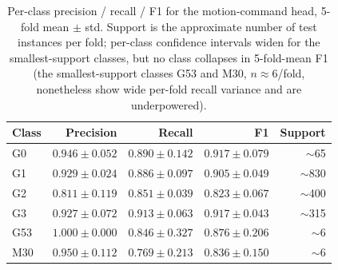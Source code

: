 \begin{table}[H]
\centering
\caption{Per-class precision / recall / F1 for the motion-command head, 5-fold mean $\pm$ std. Support is the approximate number of test instances per fold; per-class confidence intervals widen for the smallest-support classes, but no class collapses in 5-fold-mean F1 (the smallest-support classes G53 and M30, $n\!\approx\!6$/fold, nonetheless show wide per-fold recall variance and are underpowered).}
\label{tab:per_class_command}
\begin{tabular}{lrrrr}
\toprule
Class & Precision & Recall & F1 & Support \\
\midrule
G0  & $0.946 \pm 0.052$ & $0.890 \pm 0.142$ & $0.917 \pm 0.079$ & $\sim$65  \\
G1  & $0.929 \pm 0.024$ & $0.886 \pm 0.097$ & $0.905 \pm 0.049$ & $\sim$830 \\
G2  & $0.811 \pm 0.119$ & $0.851 \pm 0.039$ & $0.823 \pm 0.067$ & $\sim$400 \\
G3  & $0.927 \pm 0.072$ & $0.913 \pm 0.063$ & $0.917 \pm 0.043$ & $\sim$315 \\
G53 & $1.000 \pm 0.000$ & $0.846 \pm 0.327$ & $0.876 \pm 0.206$ & $\sim$6   \\
M30 & $0.950 \pm 0.112$ & $0.769 \pm 0.213$ & $0.836 \pm 0.150$ & $\sim$6   \\
\bottomrule
\end{tabular}
\end{table}
